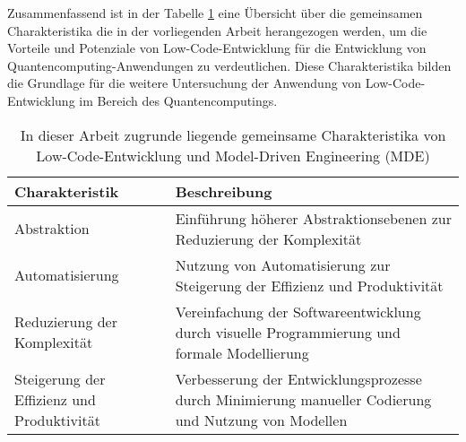 Zusammenfassend ist in der Tabelle \ref{tab:common_characteristics} eine Übersicht über die gemeinsamen Charakteristika die 
in der vorliegenden Arbeit herangezogen werden, um die Vorteile und Potenziale von Low-Code-Entwicklung 
für die Entwicklung von Quantencomputing-Anwendungen zu verdeutlichen. Diese Charakteristika bilden die Grundlage für die 
weitere Untersuchung der Anwendung von Low-Code-Entwicklung im Bereich des Quantencomputings. 

\begin{table}[h!]
    \centering
    \begin{tabular}{|p{5cm}|p{9cm}|}
    \hline
    \textbf{Charakteristik} & \textbf{Beschreibung} \\
    \hline
    Abstraktion & Einführung höherer Abstraktionsebenen zur Reduzierung der Komplexität \\
    \hline
    Automatisierung & Nutzung von Automatisierung zur Steigerung der Effizienz und Produktivität \\
    \hline
    Reduzierung der Komplexität & Vereinfachung der Softwareentwicklung durch visuelle Programmierung und formale Modellierung \\
    \hline
    Steigerung der Effizienz und Produktivität & Verbesserung der Entwicklungsprozesse durch Minimierung manueller Codierung und Nutzung von Modellen \\
    \hline
    \end{tabular}
    \caption{In dieser Arbeit zugrunde liegende gemeinsame Charakteristika von Low-Code-Entwicklung und Model-Driven Engineering (MDE)}
    \label{tab:common_characteristics}
\end{table}

